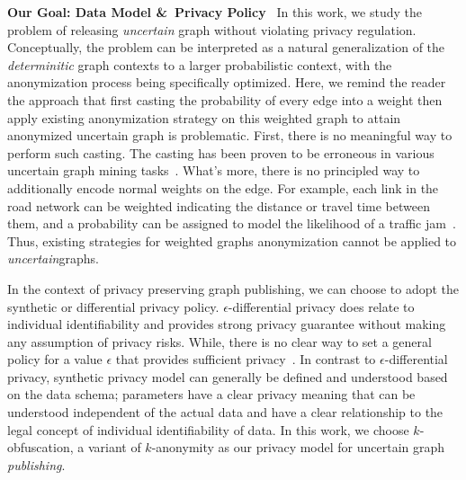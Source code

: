 \textbf{Our Goal: Data Model \&~Privacy Policy}~
In this work, we study the problem of releasing \emph{uncertain} graph without violating privacy regulation. Conceptually, the problem can be interpreted as a natural generalization of the \emph{determinitic} graph contexts to a larger probabilistic context, with the anonymization process being specifically optimized. Here, we remind the reader the approach that first casting the probability of every edge into a weight then apply existing anonymization strategy on this weighted graph to attain anonymized uncertain graph is problematic. First, there is no meaningful way to perform such casting. The casting has been proven to be erroneous in various uncertain graph mining tasks~\cite{Potamias_K_2010,Zhao_Detecting_2014}. What's more, there is no principled way to additionally encode normal weights on the edge. For example, each link in the road network can be weighted indicating the distance or travel time between them, and a probability can be assigned to model the likelihood of a traffic jam~\cite{Jin_Distance_2011}. Thus, existing strategies for weighted graphs anonymization cannot be applied to \emph{uncertain}graphs.

In the context of privacy preserving graph publishing, we can choose to adopt the synthetic or differential privacy policy.
$\epsilon$-differential privacy does relate to individual identifiability and provides strong privacy guarantee without making any assumption of privacy risks. While, there is no clear way to set a general policy for a value $\epsilon$ that provides sufficient privacy~\cite{lee2011}. In contrast to $\epsilon$-differential privacy, synthetic privacy model can generally be defined and understood based on the data schema; parameters have a clear privacy meaning that can be understood independent of the actual data and have a clear relationship to the legal concept of individual identifiability of data. In this work, we choose $k$-obfuscation, a variant of $k$-anonymity as our privacy model for uncertain graph \emph{publishing}.

